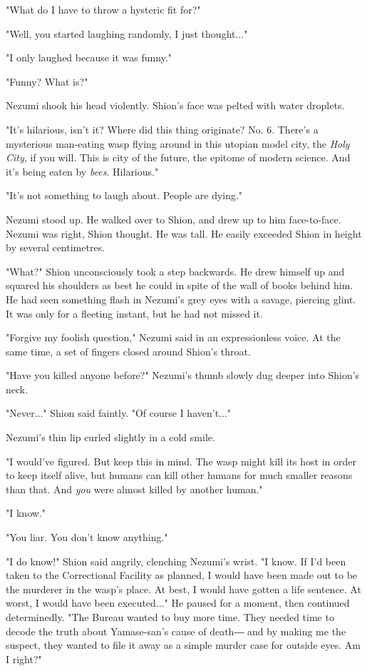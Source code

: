 "What do I have to throw a hysteric fit for?"

"Well, you started laughing randomly, I just thought..."

"I only laughed because it was funny."

"Funny? What is?"

Nezumi shook his head violently. Shion's face was pelted with water
droplets.

"It's hilarious, isn't it? Where did this thing originate? No. 6.
There's a mysterious man-eating wasp flying around in this utopian model
city, the \emph{Holy City}, if you will. This is city of the future, the
epitome of modern science. And it's being eaten by \emph{bees}. Hilarious."

"It's not something to laugh about. People are dying."

Nezumi stood up. He walked over to Shion, and drew up to him
face-to-face. Nezumi was right, Shion thought. He was tall. He easily
exceeded Shion in height by several centimetres.

"What?" Shion unconsciously took a step backwards. He drew himself up
and squared his shoulders as best he could in spite of the wall of books
behind him. He had seen something flash in Nezumi's grey eyes with a
savage, piercing glint. It was only for a fleeting instant, but he had
not missed it.

"Forgive my foolish question," Nezumi said in an expressionless voice.
At the same time, a set of fingers closed around Shion's throat.

"Have you killed anyone before?" Nezumi's thumb slowly dug deeper into
Shion's neck.

"Never..." Shion said faintly. "Of course I haven't..."

Nezumi's thin lip curled slightly in a cold smile.

"I would've figured. But keep this in mind. The wasp might kill its host
in order to keep itself alive, but humans can kill other humans for much
smaller reasons than that. And \emph{you} were almost killed by another human."

"I know."

"You liar. You don't know anything."

"I do know!" Shion said angrily, clenching Nezumi's wrist. "I know. If
I'd been taken to the Correctional Facility as planned, I would have
been made out to be the murderer in the wasp's place. At best, I would
have gotten a life sentence. At worst, I would have been executed..." He
paused for a moment, then continued determinedly. "The Bureau wanted to
buy more time. They needed time to decode the truth about Yamase-san's
cause of death― and by making me the suspect, they wanted to file it
away as a simple murder case for outside eyes. Am I right?"

